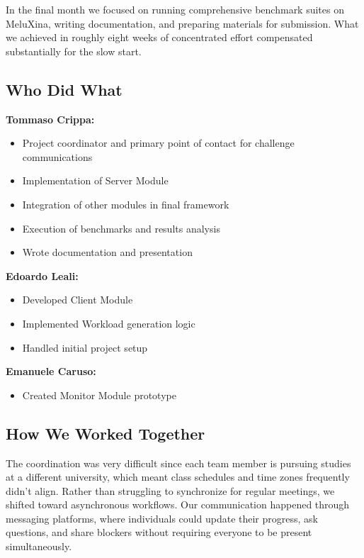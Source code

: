\documentclass[12pt,a4paper]{article}
\begin{document}
In the final month we focused on running comprehensive benchmark suites on MeluXina, writing documentation, and preparing materials for submission. What we achieved in roughly eight weeks of concentrated effort compensated substantially for the slow start.

\subsection{Who Did What}

\textbf{Tommaso Crippa:}
\begin{itemize}
    \item Project coordinator and primary point of contact for challenge communications
    \item Implementation of Server Module 
    \item Integration of other modules in final framework
    \item Execution of benchmarks and results analysis
    \item Wrote documentation and presentation

\end{itemize}

\textbf{Edoardo Leali:}
\begin{itemize}
    \item Developed Client Module
    \item Implemented Workload generation logic
    \item Handled initial project setup
\end{itemize}

\textbf{Emanuele Caruso:}
\begin{itemize}
    \item Created Monitor Module prototype
\end{itemize}

\subsection{How We Worked Together}

The coordination was very difficult since each team member is pursuing studies at a different university, which meant class schedules and time zones frequently didn't align. Rather than struggling to synchronize for regular meetings, we shifted toward asynchronous workflows. Our communication happened through messaging platforms, where individuals could update their progress, ask questions, and share blockers without requiring everyone to be present simultaneously.
\end{document}
